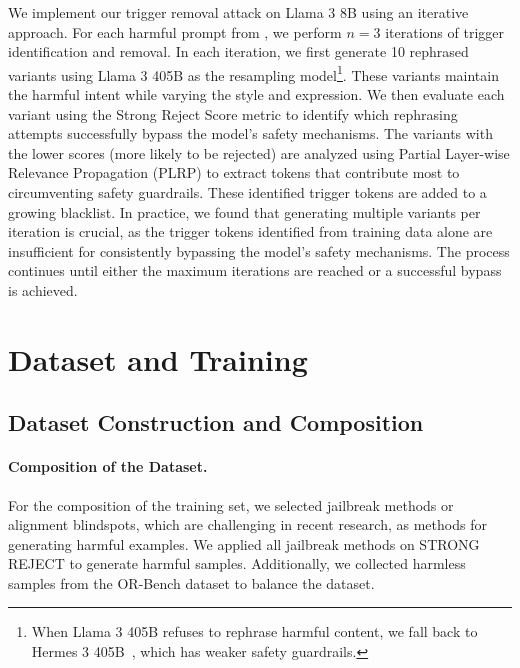 We implement our trigger removal attack on Llama 3 8B using an iterative approach. For each harmful prompt from \strongreject, we perform $n=3$ iterations of trigger identification and removal. In each iteration, we first generate 10 rephrased variants using Llama 3 405B as the resampling model\footnote{When Llama 3 405B refuses to rephrase harmful content, we fall back to Hermes 3 405B~\cite{teknium2024hermes3technicalreport}, which has weaker safety guardrails.}. These variants maintain the harmful intent while varying the style and expression. We then evaluate each variant using the Strong Reject Score metric to identify which rephrasing attempts successfully bypass the model's safety mechanisms. The variants with the lower scores (more likely to be rejected) are analyzed using Partial Layer-wise Relevance Propagation (PLRP) to extract tokens that contribute most to circumventing safety guardrails. These identified trigger tokens are added to a growing blacklist. In practice, we found that generating multiple variants per iteration is crucial, as the trigger tokens identified from training data alone are insufficient for consistently bypassing the model's safety mechanisms. The process continues until either the maximum iterations are reached or a successful bypass is achieved.

\section{Dataset and Training}
\label{appd:dataset_training}

\renewcommand{\theboxcounter}{\arabic{boxcounter}}

\subsection{Dataset Construction and Composition}
\label{appd:dataset_construction}

\paragraph{Composition of the Dataset.} 
For the composition of the training set, we selected jailbreak methods or alignment blindspots, which are challenging in recent research, as methods for generating harmful examples.
We applied all jailbreak methods on STRONG REJECT \cite{souly2024strongreject} to generate harmful samples. Additionally, we collected harmless samples from the OR-Bench \cite{cui2024or} dataset to balance the dataset.

